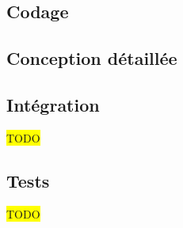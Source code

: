 \textcolor[RGB]{46, 116, 181}{\chapter{Codage}}

\section{Conception détaillée}













\section{Intégration}
\colorbox{yellow}{TODO}

\section{Tests}
\colorbox{yellow}{TODO}

